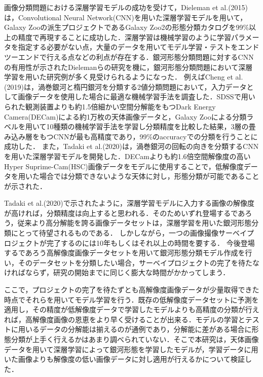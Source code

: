 \documentclass[a4j, 11pt]{jreport}
\begin{document}
画像分類問題における深層学習モデルの成功を受けて，Dieleman et al.(2015)\cite{Dieleman2015}は，Convolutional Neural Network(CNN)を用いた深層学習モデルを用いて，Galaxy Zooの派生プロジェクトであるGalaxy Zoo2の形態分類カタログを99\%以上の精度で再現することに成功した．深層学習は機械学習のように学習パラメータを指定する必要がない点，大量のデータを用いてモデル学習・テストをエンドツーエンドで行える点などの利点が存在する．銀河形態分類問題に対するCNNの有用性が示されたDielemanらの研究を機に，銀河形態分類問題において深層学習を用いた研究例が多く見受けられるようになった．
例えばCheng et al.(2019)\cite{Cheng2019}は，渦巻銀河と楕円銀河を分類する2値分類問題において，入力データとして画像データを使用した場合に最適な機械学習手法を調査した．SDSSで用いられた観測装置よりも約1.5倍細かい空間分解能をもつDark Energy Camera(DECam)による約1万枚の天体画像データと，Galaxy Zooによる分類ラベルを用いて10種類の機械学習手法を学習し分類精度を比較した結果，3層の畳み込み層をもつCNNが最も高精度であり，99\%のaccuracyでの分類を行うことに成功した．
また，Tadaki et al.(2020)\cite{Tadaki2020}は，渦巻銀河の回転の向きを分類するCNNを用いた深層学習モデルを開発した．DECamよりも約1.6倍空間解像度の高いHyper Suprime-Cam(HSC)画像データをモデルに使用することで，低解像度データを用いた場合では分類できないような天体に対し，形態分類が可能であることが示された．

Tadaki et al.(2020)で示されたように，深層学習モデルに入力する画像の解像度が高ければ，分類精度は向上すると思われる．そのためいずれ登場するであろう，従来より高分解能を誇る画像データセットは，深層学習を用いた銀河形態分類にとって待望されるものである．
しかしながら，一つの画像撮像サーベイプロジェクトが完了するのには10年もしくはそれ以上の時間を要する．
今後登場するであろう高解像度画像データセットを用いて銀河形態分類モデル作成を行い，そのデータセットを分類したい場合，サーベイプロジェクトの完了を待たなければならず，研究の開始までに同じく膨大な時間がかかってしまう．


ここで，プロジェクトの完了を待たずとも高解像度画像データが少量取得できた時点でそれらを用いてモデル学習を行う．既存の低解像度データセットに予測を適用し，その精度が低解像度データで学習したモデルよりも高精度の分類が行えれば，高解像度画像の恩恵をより早く受けることが出来る．モデルの学習とテストに用いるデータの分解能は揃えるのが通例であり，分解能に差がある場合に形態分類が上手く行えるかはあまり調べられていない．そこで本研究は，天体画像データを用いて深層学習によって銀河形態を学習したモデルが，学習データに用いた画像よりも解像度の低い画像データに対し適用が行えるかについて検証した．
\end{document}
